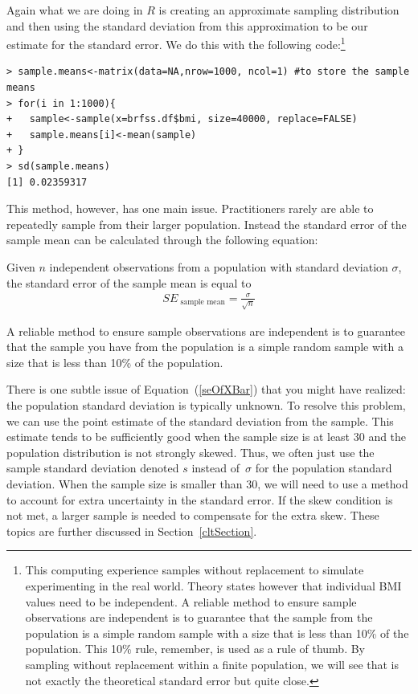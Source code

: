 Again what we are doing in $R$ is creating an approximate sampling distribution and then using the standard deviation from this approximation to be our estimate for the standard error. We do this with the following code:\footnote{This computing experience samples without replacement to simulate experimenting in the real world. Theory states however that individual BMI values need to be independent. A reliable method to ensure sample observations are independent is to guarantee that the sample from the population is a simple random sample with a size that is less than 10\% of the population. This 10\% rule, remember, is used as a rule of thumb. By sampling without replacement within a finite population, we will see that  is not exactly the theoretical standard error but quite close.}
\begin{verbatim}
> sample.means<-matrix(data=NA,nrow=1000, ncol=1) #to store the sample means
> for(i in 1:1000){
+   sample<-sample(x=brfss.df$bmi, size=40000, replace=FALSE)
+   sample.means[i]<-mean(sample)
+ }
> sd(sample.means)
[1] 0.02359317 
\end{verbatim}


This method, however, has one main issue. Practitioners rarely are able to repeatedly sample from their larger population. Instead the standard error of the sample mean can be calculated through the following equation: 

\begin{termBox}{
Given $n$ independent observations from a population with standard deviation $\sigma$, the standard error of the sample mean is equal to \vspace{-1mm}
\begin{eqnarray}
SE_{\text{ sample mean}} = \frac{\sigma}{\sqrt{n}}
\label{seOfXBar}
\end{eqnarray}\vspace{-3mm}%

A reliable method to ensure sample observations are independent is to guarantee that the sample you have from the population is a simple random sample with a size that is less than 10\% of the population.
}
\end{termBox}

There is one subtle issue of Equation~(\ref{seOfXBar}) that you might have realized: the population standard deviation is typically unknown. To resolve this problem, we can use the point estimate of the standard deviation from the sample. This estimate tends to be sufficiently good when the sample size is at least 30 and the population distribution is not strongly skewed. Thus, we often just use the sample standard deviation denoted $s$ instead of~$\sigma$ for the population standard deviation. When the sample size is smaller than 30, we will need to use a method to account for extra uncertainty in the standard error. If the skew condition is not met, a larger sample is needed to compensate for the extra skew. These topics are further discussed in Section~\ref{cltSection}. 

